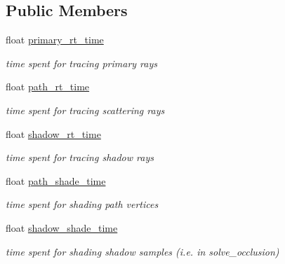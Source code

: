 \subsection*{Public Members}
\begin{DoxyCompactItemize}
\item 
\mbox{\label{struct_p_t_loop_stats_ab7baca90104144060965e61d1b5bcf18}} 
float \hyperlink{struct_p_t_loop_stats_ab7baca90104144060965e61d1b5bcf18}{primary\+\_\+rt\+\_\+time}
\begin{DoxyCompactList}\small\item\em time spent for tracing primary rays \end{DoxyCompactList}\item 
\mbox{\label{struct_p_t_loop_stats_a33ccf3868ebd610edd7b3abd92b453c9}} 
float \hyperlink{struct_p_t_loop_stats_a33ccf3868ebd610edd7b3abd92b453c9}{path\+\_\+rt\+\_\+time}
\begin{DoxyCompactList}\small\item\em time spent for tracing scattering rays \end{DoxyCompactList}\item 
\mbox{\label{struct_p_t_loop_stats_a91346d29eeed7279d3e4ee99f7ec6a01}} 
float \hyperlink{struct_p_t_loop_stats_a91346d29eeed7279d3e4ee99f7ec6a01}{shadow\+\_\+rt\+\_\+time}
\begin{DoxyCompactList}\small\item\em time spent for tracing shadow rays \end{DoxyCompactList}\item 
\mbox{\label{struct_p_t_loop_stats_a7dd32c4ed7d12b660187926e1a7dec3d}} 
float \hyperlink{struct_p_t_loop_stats_a7dd32c4ed7d12b660187926e1a7dec3d}{path\+\_\+shade\+\_\+time}
\begin{DoxyCompactList}\small\item\em time spent for shading path vertices \end{DoxyCompactList}\item 
\mbox{\label{struct_p_t_loop_stats_afa261a3e16b9576525e056da19cc6209}} 
float \hyperlink{struct_p_t_loop_stats_afa261a3e16b9576525e056da19cc6209}{shadow\+\_\+shade\+\_\+time}
\begin{DoxyCompactList}\small\item\em time spent for shading shadow samples (i.\+e. in solve\+\_\+occlusion) \end{DoxyCompactList}\item 

\end{DoxyCompactItemize}
